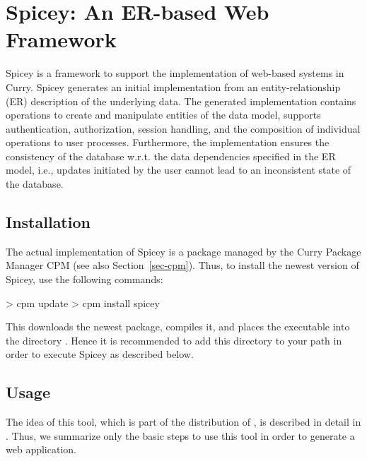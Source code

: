 \section{Spicey: An ER-based Web Framework}
\label{sec-spicey}

Spicey is a framework to support the implementation of
web-based systems in Curry. Spicey generates an initial implementation
from an entity-relationship (ER) description of the underlying
data. The generated implementation contains operations to create and
manipulate entities of the data model, supports authentication,
authorization, session handling, and the composition of individual
operations to user processes. Furthermore, the implementation ensures
the consistency of the database w.r.t. the data dependencies specified
in the ER model, i.e., updates initiated by the user cannot lead to an
inconsistent state of the database.

\subsection{Installation}

The actual implementation of Spicey is a package
managed by the Curry Package Manager CPM
(see also Section~\ref{sec-cpm}).
Thus, to install the newest version of Spicey, use the following commands:
%
\begin{curry}
> cpm update
> cpm install spicey
\end{curry}
%
This downloads the newest package, compiles it, and places
the executable  into the directory .
Hence it is recommended to add this directory to your path
in order to execute Spicey as described below.

\subsection{Usage}

The idea of this tool, which is part of the distribution of \CYS,
is described in detail in \cite{HanusKoschnicke14TPLP}.
Thus, we summarize only the basic steps to use this tool
in order to generate a web application.


